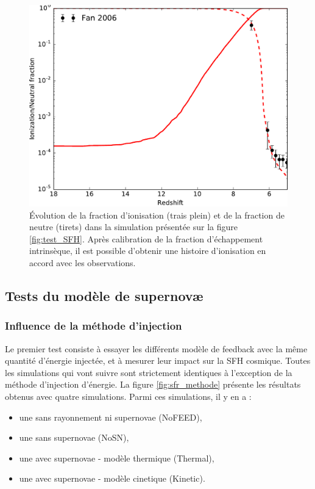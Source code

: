 \begin{figure}
        \includegraphics[width=.95\linewidth]{img/02/xion.pdf} 
        \caption[Histoire d'ionisation]{Évolution de la fraction d'ionisation (trais plein) et de la fraction de neutre (tirets) dans la simulation présentée sur la figure \ref{fig:test_SFH}.
        Après calibration de la fraction d’échappement intrinsèque, il est possible d'obtenir une histoire d'ionisation en accord avec les observations.
 		\label{fig:test_xion}}
\end{figure}



\subsection{Tests du modèle de supernovæ}


\subsubsection{Influence de la méthode d'injection}
\label{sec:snmethod}

Le premier test consiste à essayer les différents modèle de feedback avec la même quantité d'énergie injectée, et à mesurer leur impact sur la \ac{SFH} cosmique.
Toutes les simulations qui vont suivre sont strictement identiques à l'exception de la méthode d'injection d'énergie.
La figure \ref{fig:sfr_methode} présente les résultats obtenus avec quatre simulations.
Parmi ces simulations, il y en a :
\begin{itemize}
\item une sans rayonnement ni supernovae (NoFEED),
\item une sans supernovae (NoSN),
\item une avec supernovae - modèle thermique (Thermal),
\item une avec supernovae - modèle cinetique (Kinetic).
\end{itemize}

